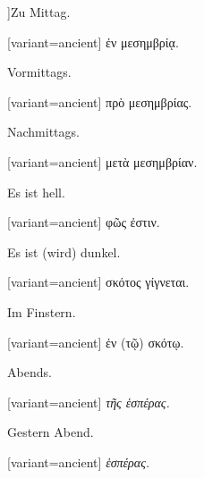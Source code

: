 ]\indent Zu Mittag.

\switchcolumn

\begin{greek}[variant=ancient]%
ἐν μεσημβρίᾳ.

\end{greek}%
\switchcolumn*

Vormittags.

\switchcolumn

\begin{greek}[variant=ancient]%
πρὸ μεσημβρίας.

\end{greek}%
\switchcolumn*

Nachmittags.

\switchcolumn

\begin{greek}[variant=ancient]%
μετὰ μεσημβρίαν.

\end{greek}%
\switchcolumn*

Es ist hell.

\switchcolumn

\begin{greek}[variant=ancient]%
φῶς ἐστιν.

\end{greek}%
\switchcolumn*

Es ist (wird) dunkel.

\switchcolumn

\begin{greek}[variant=ancient]%
σκότος γίγνεται.

\end{greek}%
\switchcolumn*

Im Finstern.

\switchcolumn

\begin{greek}[variant=ancient]%
ἐν (τῷ) σκότῳ.

\end{greek}%
\switchcolumn*

Abends.

\switchcolumn

\begin{greek}[variant=ancient]%
\emph{τῆς ἑσπέρας.}

\end{greek}%
\switchcolumn*

Gestern Abend.

\switchcolumn

\begin{greek}[variant=ancient]%
\emph{ἑσπέρας.}

\end{greek}%
\switchcolumn*


